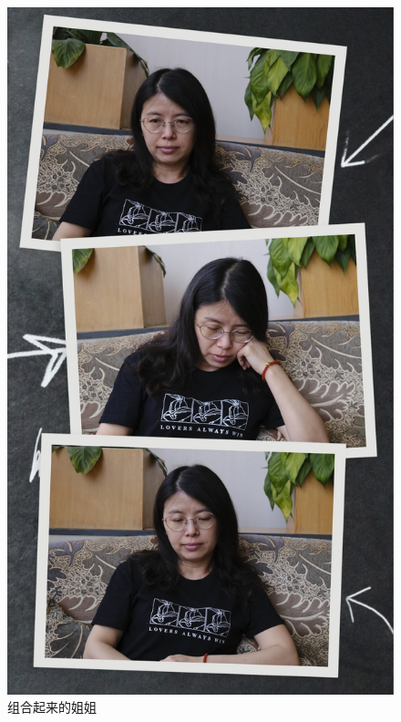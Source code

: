 \documentclass[11pt,a4paper,oneside,fleqn]{article}
\begin{document}
\begin{figure}[htbp]
	\centering
	\includegraphics[scale=0.17]{Figs/20210609_171533999_iOS.jpg} %
	\caption{组合起来的姐姐}
	\label{FIG1-1}
\end{figure}
\end{document}
